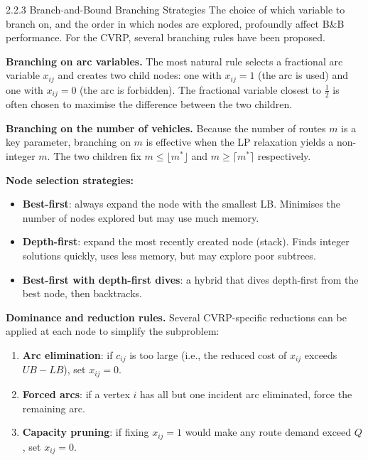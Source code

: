 \documentclass[aspectratio=169,10pt]{beamer}
\begin{document}
\begin{frame}[allowframebreaks]{2.2.3 Branch-and-Bound Branching Strategies}
  The choice of which variable to branch on, and the order in which nodes
  are explored, profoundly affect B\&B performance. For the CVRP, several
  branching rules have been proposed.

  \bigskip
  \textbf{Branching on arc variables.} The most natural rule selects a
  fractional arc variable $x_{ij}$ and creates two child nodes: one with
  $x_{ij}=1$ (the arc is used) and one with $x_{ij}=0$ (the arc is
  forbidden). The fractional variable closest to $\frac{1}{2}$ is often
  chosen to maximise the difference between the two children.

  \bigskip
  \textbf{Branching on the number of vehicles.} Because the number of
  routes $m$ is a key parameter, branching on $m$ is effective when the
  LP relaxation yields a non-integer $m$. The two children fix $m \leq
  \lfloor m^* \rfloor$ and $m \geq \lceil m^* \rceil$ respectively.

  \bigskip
  \textbf{Node selection strategies:}
  \begin{itemize}
    \item \textbf{Best-first}: always expand the node with the smallest LB.
          Minimises the number of nodes explored but may use much memory.
    \item \textbf{Depth-first}: expand the most recently created node (stack).
          Finds integer solutions quickly, uses less memory, but may explore
          poor subtrees.
    \item \textbf{Best-first with depth-first dives}: a hybrid that dives
          depth-first from the best node, then backtracks.
  \end{itemize}

  \framebreak

  \textbf{Dominance and reduction rules.} Several CVRP-specific reductions
  can be applied at each node to simplify the subproblem:

  \begin{enumerate}
    \item \textbf{Arc elimination}: if $c_{ij}$ is too large (i.e., the
          reduced cost of $x_{ij}$ exceeds $UB - LB$), set $x_{ij}=0$.
    \item \textbf{Forced arcs}: if a vertex $i$ has all but one incident arc
          eliminated, force the remaining arc.
    \item \textbf{Capacity pruning}: if fixing $x_{ij}=1$ would make any
          route demand exceed $Q$, set $x_{ij}=0$.
  \end{enumerate}


\end{frame}
\end{document}
